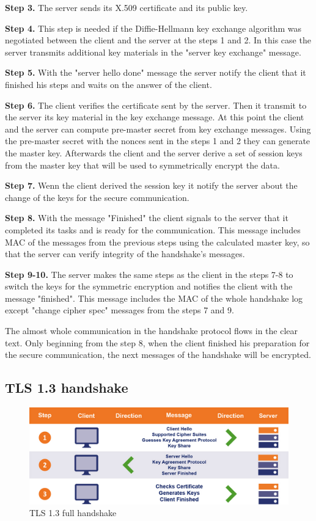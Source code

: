 \textbf{Step 3.} The server sends its X.509 certificate and its public key.

\textbf{Step 4.} This step is needed if the Diffie-Hellmann key exchange algorithm was negotiated between the client and the server at the steps 1 and 2. In this case the server transmits additional key materials in the "server key exchange" message.

\textbf{Step 5.} With the "server hello done" message the server notify the client that it finished his steps and waits on the answer of the client.

\textbf{Step 6.} The client verifies the certificate sent by the server. Then it transmit to the server its key material in the key exchange message. 
At this point the client and the server can compute pre-master secret from key exchange messages. Using the pre-master secret with the nonces sent in the steps 1 and 2 they can generate the master key. Afterwards the client and the server derive a set of session keys from the master key that will be used to symmetrically encrypt the data.

\textbf{Step 7.} Wenn the client derived the session key it notify the server about the change of the keys for the secure communication.

\textbf{Step 8.} With the message "Finished" the client signals to the server that it completed its tasks and is ready for the communication. This message includes MAC of the messages from the previous steps using the calculated master key, so that the server can verify integrity of the handshake's messages.

\textbf{Step 9-10.} The server makes the same steps as the client in the steps 7-8 to switch the keys for the symmetric encryption and notifies the client with the message "finished". This message includes the MAC of the whole handshake log except "change cipher spec" messages from the steps 7 and 9. \cite{sslstore:handshake}\cite{Hassenstein}

The almost whole communication in the handshake protocol flows in the clear text. Only beginning from the step 8, when the client finished his preparation for the secure communication, the next messages of the handshake will be encrypted.

\subsection{TLS 1.3 handshake}
\label{subsec:handshake1_3}

\begin{figure}[H]
	\centering
		\includegraphics[scale=0.35]{images/handshake1_3.jpg}
	\caption{TLS 1.3 full handshake \cite{sslstore:handshake}}
	\label{fig:handshake1_3}
\end{figure}

